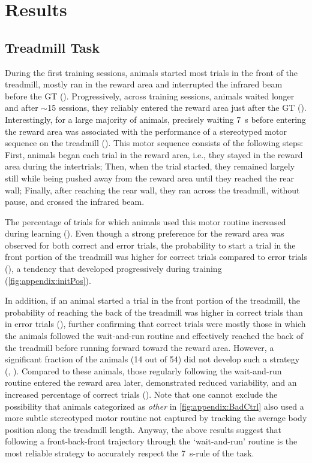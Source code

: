 \section{Results}
\label{ch:time:results}

\subsection{Treadmill Task}
\label{ch:time:treadmill}
During the first training sessions, animals started most trials in the front of the treadmill, mostly ran in the reward area and interrupted the infrared beam before the GT ().
Progressively, across training sessions, animals waited longer and after $\sim$15 sessions, they reliably entered the reward area just after the GT ().
Interestingly, for a large majority of animals, precisely waiting 7~s before entering the reward area was associated with the performance of a stereotyped motor sequence on the treadmill ().
This motor sequence consists of the following steps:
    First, animals began each trial in the reward area, i.e., they stayed in the reward area during the intertrials;
    Then, when the trial started, they remained largely still while being pushed away from the reward area until they reached the rear wall;
    Finally, after reaching the rear wall, they ran across the treadmill, without pause, and crossed the infrared beam.

The percentage of trials for which animals used this motor routine increased during learning ().
Even though a strong preference for the reward area was observed for both correct and error trials, the probability to start a trial in the front portion of the treadmill was higher for correct trials compared to error trials (), a tendency that developed progressively during training (\autoref{fig:appendix:initPos}).
\par
In addition, if an animal started a trial in the front portion of the treadmill, the probability of reaching the back of the treadmill was higher in correct trials than in error trials (), further confirming that correct trials were mostly those in which the animals followed the wait-and-run routine and effectively reached the back of the treadmill before running forward toward the reward area.
However, a significant fraction of the animals (14 out of 54) did not develop such a strategy (, ).
Compared to these animals, those regularly following the wait-and-run routine entered the reward area later, demonstrated reduced variability, and an increased percentage of correct trials ().
Note that one cannot exclude the possibility that animals categorized as \textit{other} in \autoref{fig:appendix:BadCtrl} also used a more subtle stereotyped motor routine not captured by tracking the average body position along the treadmill length.
Anyway, the above results suggest that following a front-back-front trajectory through the `wait-and-run' routine is the most reliable strategy to accurately respect the 7~s-rule of the task.



